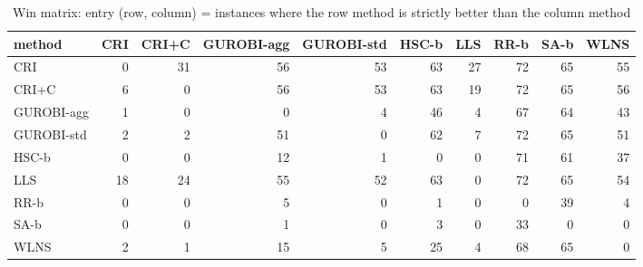 \begin{table}[htbp]
\centering
\small
\caption{Win matrix: entry (row, column) = instances where the row method is strictly better than the column method}
\label{tab:E4b_equal_budgets_60s_b60_wins}
\begin{tabular}{lrrrrrrrrr}
\toprule
method & CRI & CRI+C & GUROBI-agg & GUROBI-std & HSC-b & LLS & RR-b & SA-b & WLNS \\
\midrule
CRI & 0 & 31 & 56 & 53 & 63 & 27 & 72 & 65 & 55 \\
CRI+C & 6 & 0 & 56 & 53 & 63 & 19 & 72 & 65 & 56 \\
GUROBI-agg & 1 & 0 & 0 & 4 & 46 & 4 & 67 & 64 & 43 \\
GUROBI-std & 2 & 2 & 51 & 0 & 62 & 7 & 72 & 65 & 51 \\
HSC-b & 0 & 0 & 12 & 1 & 0 & 0 & 71 & 61 & 37 \\
LLS & 18 & 24 & 55 & 52 & 63 & 0 & 72 & 65 & 54 \\
RR-b & 0 & 0 & 5 & 0 & 1 & 0 & 0 & 39 & 4 \\
SA-b & 0 & 0 & 1 & 0 & 3 & 0 & 33 & 0 & 0 \\
WLNS & 2 & 1 & 15 & 5 & 25 & 4 & 68 & 65 & 0 \\
\bottomrule
\end{tabular}
\end{table}
